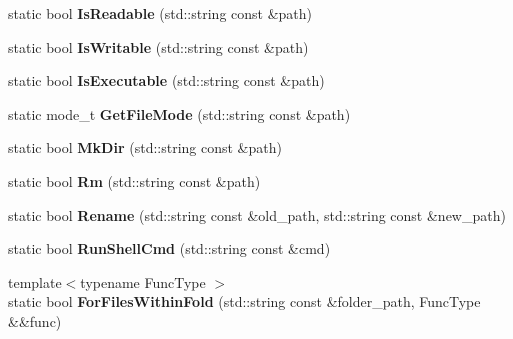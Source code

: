 \begin{DoxyCompactItemize}
\item 
\hypertarget{classlsf_1_1util_1_1System_a5b6202572344b214000d9fa8c5ed9984}{
static bool {\bfseries IsReadable} (std::string const \&path)}
\label{classlsf_1_1util_1_1System_a5b6202572344b214000d9fa8c5ed9984}

\item 
\hypertarget{classlsf_1_1util_1_1System_ac9ce08b7cb3cfce9fe9d69a875d3ff6c}{
static bool {\bfseries IsWritable} (std::string const \&path)}
\label{classlsf_1_1util_1_1System_ac9ce08b7cb3cfce9fe9d69a875d3ff6c}

\item 
\hypertarget{classlsf_1_1util_1_1System_ad09deda9908b4373e4b62b5b724c50d9}{
static bool {\bfseries IsExecutable} (std::string const \&path)}
\label{classlsf_1_1util_1_1System_ad09deda9908b4373e4b62b5b724c50d9}

\item 
\hypertarget{classlsf_1_1util_1_1System_a667b5d603c3a6210e6355b5a63a670a8}{
static mode\_\-t {\bfseries GetFileMode} (std::string const \&path)}
\label{classlsf_1_1util_1_1System_a667b5d603c3a6210e6355b5a63a670a8}

\item 
\hypertarget{classlsf_1_1util_1_1System_a964ede98dd06653a6b3a765aaef4f1b1}{
static bool {\bfseries MkDir} (std::string const \&path)}
\label{classlsf_1_1util_1_1System_a964ede98dd06653a6b3a765aaef4f1b1}

\item 
\hypertarget{classlsf_1_1util_1_1System_a61df94045c7410c7173e245f50d09b73}{
static bool {\bfseries Rm} (std::string const \&path)}
\label{classlsf_1_1util_1_1System_a61df94045c7410c7173e245f50d09b73}

\item 
\hypertarget{classlsf_1_1util_1_1System_a5dabe3676d0ef7d6c0780bcc28e84a01}{
static bool {\bfseries Rename} (std::string const \&old\_\-path, std::string const \&new\_\-path)}
\label{classlsf_1_1util_1_1System_a5dabe3676d0ef7d6c0780bcc28e84a01}

\item 
\hypertarget{classlsf_1_1util_1_1System_afd50ecf8a675d9351cbaf58f55f12eb0}{
static bool {\bfseries RunShellCmd} (std::string const \&cmd)}
\label{classlsf_1_1util_1_1System_afd50ecf8a675d9351cbaf58f55f12eb0}

\item 
\hypertarget{classlsf_1_1util_1_1System_a1cb223f53208a948c397f6f982536554}{
{\footnotesize template$<$typename FuncType $>$ }\\static bool {\bfseries ForFilesWithinFold} (std::string const \&folder\_\-path, FuncType \&\&func)}
\label{classlsf_1_1util_1_1System_a1cb223f53208a948c397f6f982536554}


\end{DoxyCompactItemize}
